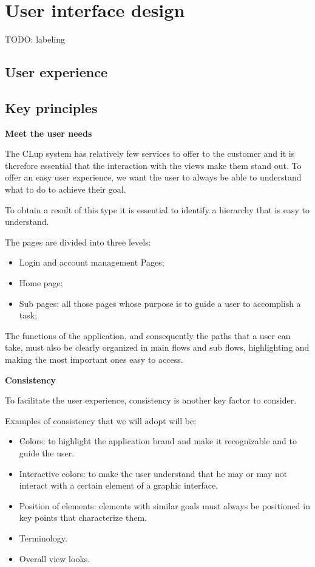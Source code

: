 \section{User interface design}
\label{sect:userinterfacedesign}

TODO: labeling

\subsection{User experience}
\label{subsect:userexperience}

\subsection{Key principles}
\label{subsubsect:keyprinciples}

\noindent
\textbf{Meet the user needs}

The CLup system has relatively few services to offer to the customer and it is therefore essential that the interaction with the views make them stand out. To offer an easy user experience, we want the user to always be able to understand what to do to achieve their goal.

To obtain a result of this type it is essential to identify a hierarchy that is easy to understand.

\noindent
The pages are divided into three levels:
\begin{itemize}[topsep=0pt]
    \item Login and account management Pages;
    \item Home page;
    \item Sub pages: all those pages whose purpose is to guide a user to accomplish a task;
\end{itemize}

The functions of the application, and consequently the paths that a user can take, must also be clearly organized in main flows and sub flows, highlighting and making the most important ones easy to access.

\noindent
\textbf{Consistency}

To facilitate the user experience, consistency is another key factor to consider.

\noindent
Examples of consistency that we will adopt will be:
\begin{itemize}[topsep=0pt]
    \item Colors: to highlight the application brand and make it recognizable and to guide the user.
    \item Interactive colors: to make the user understand that he may or may not interact with a certain element of a graphic interface.
    \item Position of elements: elements with similar goals must always be positioned in key points that characterize them.
    \item Terminology.
    \item Overall view looks.
\end{itemize}

